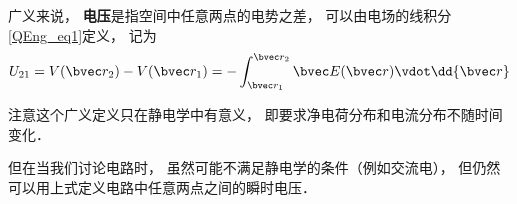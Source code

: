 

广义来说， \textbf{电压}是指空间中任意两点的电势之差， 可以由电场的线积分\autoref{QEng_eq1}定义， 记为
\begin{equation}
U_{21} = V(\bvec r_2) - V(\bvec r_1) = - \int_{\bvec r_1}^{\bvec r_2} \bvec E(\bvec r) \vdot \dd{\bvec r}
\end{equation}

注意这个广义定义只在静电学中有意义， 即要求净电荷分布和电流分布不随时间变化．

但在当我们讨论电路时， 虽然可能不满足静电学的条件（例如交流电）， 但仍然可以用上式定义电路中任意两点之间的瞬时电压．

